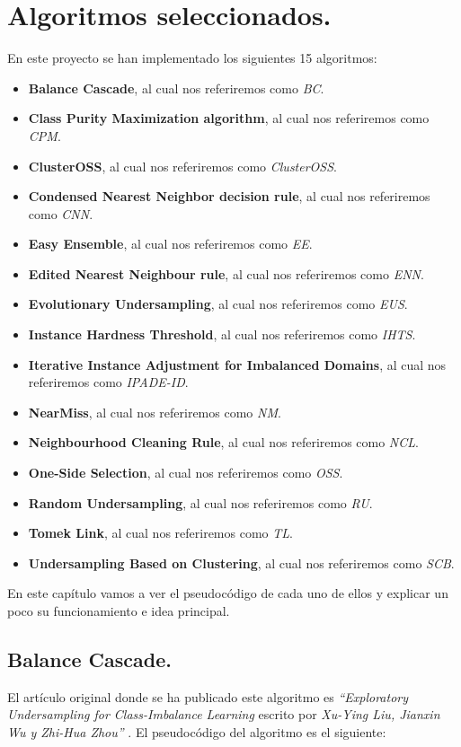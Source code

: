 \chapter{Algoritmos seleccionados.} \label{ch:algoritmos}

En este proyecto se han implementado los siguientes 15 algoritmos: 

\begin{itemize}
	\item \textbf{Balance Cascade}, al cual nos referiremos como \textit{BC}.
	\item \textbf{Class Purity Maximization algorithm}, al cual nos referiremos como \textit{CPM}.
	\item \textbf{ClusterOSS}, al cual nos referiremos como \textit{ClusterOSS}.
	\item \textbf{Condensed Nearest Neighbor decision rule}, al cual nos referiremos como \textit{CNN}.
	\item \textbf{Easy Ensemble}, al cual nos referiremos como \textit{EE}.
	\item \textbf{Edited Nearest Neighbour rule}, al cual nos referiremos como \textit{ENN}.
	\item \textbf{Evolutionary Undersampling}, al cual nos referiremos como \textit{EUS}.
	\item \textbf{Instance Hardness Threshold}, al cual nos referiremos como \textit{IHTS}.
	\item \textbf{Iterative Instance Adjustment for Imbalanced Domains}, al cual nos referiremos como \textit{IPADE-ID}.
	\item \textbf{NearMiss}, al cual nos referiremos como \textit{NM}.
	\item \textbf{Neighbourhood Cleaning Rule}, al cual nos referiremos como \textit{NCL}.
	\item \textbf{One-Side Selection}, al cual nos referiremos como \textit{OSS}.
	\item \textbf{Random Undersampling}, al cual nos referiremos como \textit{RU}.
	\item \textbf{Tomek Link}, al cual nos referiremos como \textit{TL}.
	\item \textbf{Undersampling Based on Clustering}, al cual nos referiremos como \textit{SCB}.
\end{itemize}

En este capítulo vamos a ver el pseudocódigo de cada uno de ellos y explicar un poco su funcionamiento e idea principal.

\section{Balance Cascade.} \label{sec:alg_bc}
El artículo original donde se ha publicado este algoritmo es \textit{``Exploratory Undersampling for Class-Imbalance Learning} escrito por \textit{Xu-Ying Liu, Jianxin Wu y Zhi-Hua Zhou''} \cite{bc-ee}. El pseudocódigo del algoritmo es el siguiente:

